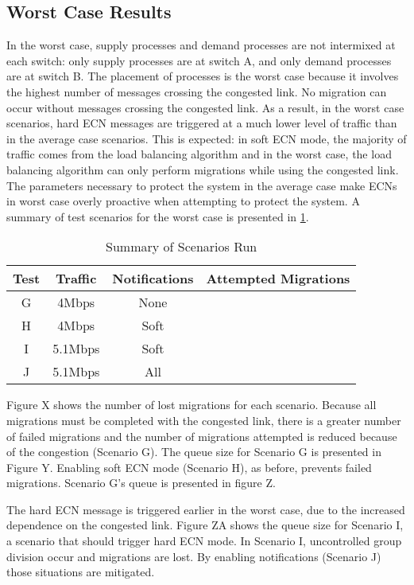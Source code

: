 
\subsection{Worst Case Results}

In the worst case, supply processes and demand processes are not intermixed at each switch: only supply processes are at switch A, and only demand processes are at switch B.
The placement of processes is the worst case because it involves the highest number of messages crossing the congested link.
No migration can occur without messages crossing the congested link.
As a result, in the worst case scenarios, hard \ac{ECN} messages are triggered at a much lower level of traffic than in the average case scenarios.
This is expected: in soft \ac{ECN} mode, the majority of traffic comes from the load balancing algorithm and in the worst case, the load balancing algorithm can only perform migrations while using the congested link.
The parameters necessary to protect the system in the average case make \acp{ECN} in worst case overly proactive when attempting to protect the system. 
A summary of test scenarios for the worst case is presented in \ref{tab:scenarios-worst}.

\begin{table}
\centering
\caption{Summary of Scenarios Run}
\begin{tabular}{| c | c | c | c |}
    \hline
    Test & Traffic & Notifications & Attempted Migrations \\ \hline
    G & 4Mbps & None &  \\ \hline
    H & 4Mbps & Soft &  \\ \hline
    I & 5.1Mbps & Soft & \\ \hline
    J & 5.1Mbps & All &  \\ \hline
\end{tabular}
\label{tab:scenarios-worst}
\end{table}

Figure X shows the number of lost migrations for each scenario.
Because all migrations must be completed with the congested link, there is a greater number of failed migrations and the number of migrations attempted is reduced because of the congestion (Scenario G).
The queue size for Scenario G is presented in Figure Y.
Enabling soft ECN mode (Scenario H), as before, prevents failed migrations.
Scenario G's queue is presented in figure Z.

The hard ECN message is triggered earlier in the worst case, due to the increased dependence on the congested link.
Figure ZA shows the queue size for Scenario I, a scenario that should trigger hard ECN mode.
In Scenario I, uncontrolled group division occur and migrations are lost.
By enabling notifications (Scenario J) those situations are mitigated.
